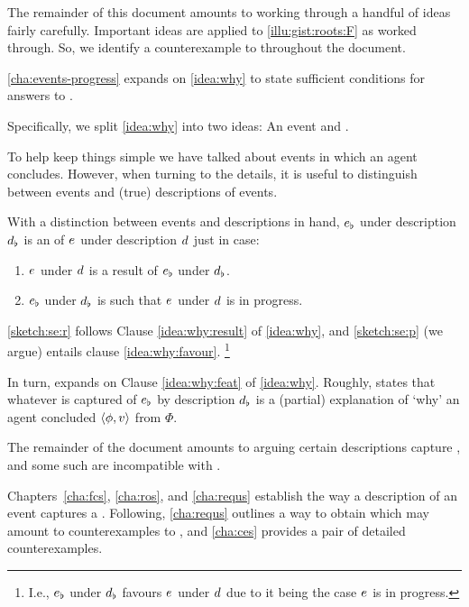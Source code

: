 \begin{note}
  The remainder of this document amounts to working through a handful of ideas fairly carefully.
  Important ideas are applied to \autoref{illu:gist:roots:F} as worked through.
  So, we identify a counterexample to \issueInclusion{} throughout the document.
\end{note}


\begin{note}
  \autoref{cha:events-progress} expands on \autoref{idea:why} to state sufficient conditions for answers to \qWhy{}.

  Specifically, we split \autoref{idea:why} into two ideas:
  An \se{} event and \progEx{}.

  To help keep things simple we have talked about events in which an agent concludes.
  However, when turning to the details, it is useful to distinguish between events and (true) descriptions of events.

  With a distinction between events and descriptions in hand, \(e\sb{\flat}\) under description \(d\sb{\flat}\) is an \emph{\se{}} of \(e\sb{}\) under description \(d\sb{}\) just in case:

  \begin{enumerate}[label=\arabic*., ref=\arabic*]
  \item
    \label{sketch:se:r}
    \(e\sb{}\) under \(d\sb{}\) is a result of \(e\sb{\flat}\) under \(d\sb{\flat}\).
  \item
    \label{sketch:se:p}
    \(e\sb{\flat}\) under \(d\sb{\flat}\) is such that \(e\sb{}\) under \(d\sb{}\) is in progress.
  \end{enumerate}
  \ref{sketch:se:r} follows Clause \ref{idea:why:result} of \autoref{idea:why}, and \ref{sketch:se:p} (we argue) entails clause \ref{idea:why:favour}.%
  \footnote{
    I.e., \(e\sb{\flat}\) under \(d\sb{\flat}\) favours \(e\sb{}\) under \(d\sb{}\) due to it being the case \(e\sb{}\) is in progress.
  }

  In turn, \progEx{} expands on Clause \ref{idea:why:feat} of \autoref{idea:why}.
  Roughly, \progEx{} states that whatever is captured of \(e\sb{\flat}\) by description \(d\sb{\flat}\) is a (partial) explanation of `why' an agent concluded \(\langle\phi, v\rangle\) from \(\Phi\).

  The remainder of the document amounts to arguing certain descriptions capture , and some such  are incompatible with \issueInclusion{}.

  Chapters~\ref{cha:fcs}, \ref{cha:ros}, and \autoref{cha:requs} establish the way a description of an event captures a \fingfr{}.
  Following, \autoref{cha:requs} outlines a way to obtain  which may amount to counterexamples to \issueInclusion{}, and \autoref{cha:ces} provides a pair of detailed counterexamples.
\end{note}

